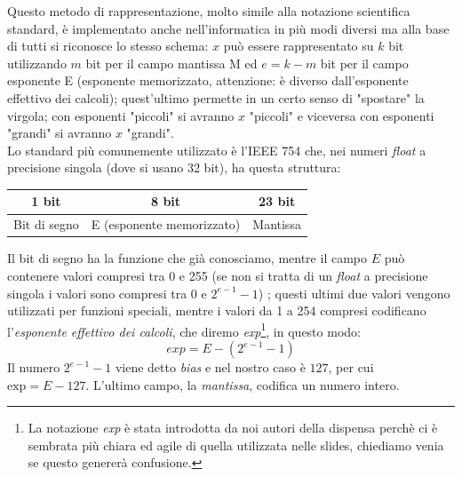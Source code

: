\documentclass[class=book, crop=false, oneside]{standalone}
\begin{document}
Questo metodo di rappresentazione, molto simile alla notazione scientifica standard, è implementato anche nell'informatica in più modi diversi ma alla base di tutti si riconosce lo stesso schema: \(x\) può essere rappresentato su \(k\) bit utilizzando \(m\) bit per il campo mantissa M ed \(e=k-m\) bit per il campo esponente E (esponente memorizzato, attenzione: è diverso dall'esponente effettivo dei calcoli); quest'ultimo permette in un certo senso di "spostare" la virgola; con esponenti "piccoli" si avranno \(x\) "piccoli" e viceversa con esponenti "grandi" si avranno \(x\) "grandi".\\
Lo standard più comunemente utilizzato è l'IEEE 754 che, nei numeri \emph{float} a precisione singola (dove si usano 32 bit), ha questa struttura:
\begin{table}[h!]
	\centering
	\begin{tabular}{|l|l|l|}
		\hline
		\multicolumn{1}{|c|}{1 bit} & \multicolumn{1}{c|}{8 bit} & \multicolumn{1}{c|}{23 bit} \\ \hline
		Bit di segno                & E (esponente memorizzato)    & Mantissa                    \\ \hline
	\end{tabular}
\end{table}


Il bit di segno ha la funzione che già conosciamo, mentre il campo \(E\) può contenere valori compresi tra 0 e 255 (se non si tratta di un \emph{float} a precisione singola i valori sono compresi tra 0 e \(2^{e-1}-1\))%
; questi ultimi due valori vengono utilizzati per funzioni speciali, mentre i valori da 1 a 254 compresi codificano l'\emph{esponente effettivo dei calcoli}, che diremo \emph{exp}\footnote{La notazione \emph{exp} è stata introdotta da noi autori della dispensa perchè ci è sembrata più chiara ed agile di quella utilizzata nelle slides, chiediamo venia se questo genererà confusione.}, in questo modo:
\begin{equation*}
	exp=E-(2^{e-1}-1)
\end{equation*}
Il numero \(2^{e-1}-1\) viene detto \emph{bias} e nel nostro caso è \(127\), per cui \(\textrm{exp}=E-127\). L'ultimo campo, la \emph{mantissa}, codifica un numero intero.
\end{document}
